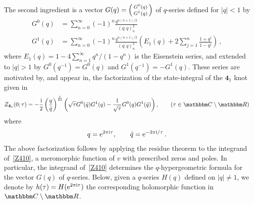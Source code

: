 \documentclass[12pt,reqno]{amsart}
\theoremstyle{definition}
\def\BR{\mathbbm R}
\def\BC{\mathbbm C}
\def\tq{\tilde{q}}
\def\ri{\mathrm{i}}
\def\re{{\rm e}}
\def\ri{{\rm i}}
\newenvironment{psmall}{\left(\begin{smallmatrix}}{\end{smallmatrix}\right)}
\def\md{\mathbf}
\newcommand{\knot}[1]{\md{#1}}
\begin{document}
The second ingredient is a vector
$G(q)=\begin{psmall} G^0(q) \\ G^1(q)
\end{psmall}$ of $q$-series defined for $|q|<1$ by
\begin{subequations}
\begin{align}
\label{gm0}
G^0(q) &=\sum_{n=0}^\infty (-1)^n \frac{q^{n(n+1)/2}}{(q;q)_n^2}
\\
\label{Gm0}
G^1(q) &=\sum_{n=0}^\infty (-1)^n \frac{q^{n(n+1)/2}}{(q;q)_n^2}
\left(E_1(q) + 2 \sum_{j=1}^n \frac{1+q^j}{1-q^j} \right) \,,
\end{align}
\end{subequations}
where $E_1(q)=1-4\sum_{n=1}^\infty q^n/(1-q^n)$ is the Eisenstein
series, and extended to $|q|>1$ by $G^0(q^{-1})=G^0(q)$ and
$G^1(q^{-1})=-G^1(q)$.  These series are motivated by, and appear in,
the factorization of the state-integral of the $\knot{4}_1$ knot given
in~\cite[Cor.1.7]{GK:qseries}
\begin{equation}
  \label{Z410-fac}
  Z_{\knot{4}_1}(0;\tau) =
  - \frac{\ri}{2} \left(\frac{q}{\tq}\right)^{\frac{1}{24}} 
  \left(
    \sqrt{\tau} G^0(\tq) G^1(q) - \frac{1}{\sqrt{\tau}} G^0(q) G^1(\tq) 
  \right), \qquad (\tau \in \BC\setminus\BR)
\end{equation}
where 
\begin{equation}
\label{qqt}
q=\re^{2 \pi \ri \tau}, \qquad \tq=\re^{-2\pi \ri/\tau} \,.
\end{equation}
The above factorization follows by applying the residue theorem to the
integrand of~\eqref{Z410}, a meromorphic function of $v$ with
prescribed zeros and poles. In particular, the integrand
of~\eqref{Z410} determines the $q$-hypergeometric formula for the
vector $G(q)$ of $q$-series.  Below, given a $q$-series $H(q)$ defined
on $|q| \neq 1$, we denote by $h(\tau)= H(\re^{2\pi \ri\tau})$ the
corresponding holomorphic function in $\BC\setminus\BR$.
\end{document}
